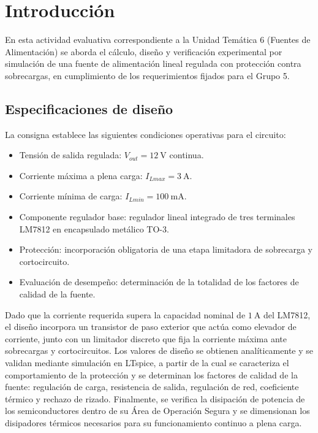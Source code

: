 \chapter{Introducción}
\label{sec.c5:introduccion}

En esta actividad evaluativa correspondiente a la Unidad Temática 6 (Fuentes de
Alimentación) se aborda el cálculo, diseño y verificación experimental por
simulación de una fuente de alimentación lineal regulada con protección contra
sobrecargas, en cumplimiento de los requerimientos fijados para el Grupo 5.

\section{Especificaciones de diseño}
\label{sec.c5:especificaciones}

La consigna establece las siguientes condiciones operativas para el circuito:
\begin{itemize}
    \item Tensión de salida regulada: $V_{out} = \SI{12}{\volt}$ continua.
    \item Corriente máxima a plena carga: $I_{Lmax} = \SI{3}{\ampere}$.
    \item Corriente mínima de carga: $I_{Lmin} = \SI{100}{\milli\ampere}$.
    \item Componente regulador base: regulador lineal integrado de tres terminales LM7812 en encapsulado metálico TO-3.
    \item Protección: incorporación obligatoria de una etapa limitadora de sobrecarga y cortocircuito.
    \item Evaluación de desempeño: determinación de la totalidad de los factores de calidad de la fuente.
\end{itemize}

Dado que la corriente requerida supera la capacidad nominal de $\SI{1}{\ampere}$ del LM7812, el diseño
incorpora un transistor de paso exterior que actúa como elevador de corriente, junto con un limitador
discreto que fija la corriente máxima ante sobrecargas y cortocircuitos. Los valores de diseño se obtienen
analíticamente y se validan mediante simulación en LTspice, a partir de la cual se caracteriza el
comportamiento de la protección y se determinan los factores de calidad de la fuente: regulación de carga,
resistencia de salida, regulación de red, coeficiente térmico y rechazo de rizado. Finalmente, se verifica
la disipación de potencia de los semiconductores dentro de su Área de Operación Segura y se dimensionan los
disipadores térmicos necesarios para su funcionamiento continuo a plena carga.
